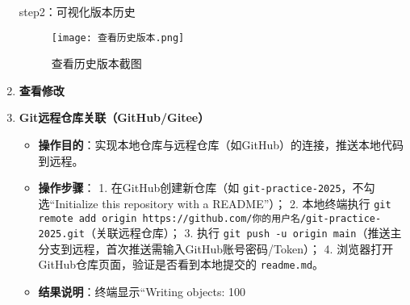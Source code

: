 \documentclass[a4paper]{article}
\begin{document}
\begin{enumerate}[itemsep=2\parskip, label=实例1.\arabic*]
\begin {description}[
leftmargin=7em, %
labelwidth=5em, %
labelsep=1em, %
itemsep=1\parskip, %
align=right %
]
step2：可视化版本历史

\begin{figure}[hbtp]  %
  \centering  %
  \texttt{[image: 查看历史版本.png]}  %
  \caption{查看历史版本截图}  %
  \label{fig:git-log}  %
\end{figure} 
\end{description}

\item \textbf {查看修改}

\item \textbf{Git远程仓库关联（GitHub/Gitee）}
  \begin{itemize}[leftmargin=2em, itemsep=0.5\parskip]
    \item \textbf{操作目的}：实现本地仓库与远程仓库（如GitHub）的连接，推送本地代码到远程。
    \item \textbf{操作步骤}：
      1. 在GitHub创建新仓库（如 \texttt{git-practice-2025}，不勾选“Initialize this repository with a README”）；
      2. 本地终端执行 \texttt{git remote add origin https://github.com/你的用户名/git-practice-2025.git}（关联远程仓库）；
      3. 执行 \texttt{git push -u origin main}（推送主分支到远程，首次推送需输入GitHub账号密码/Token）；
      4. 浏览器打开GitHub仓库页面，验证是否看到本地提交的 \texttt{readme.md}。
    \item \textbf{结果说明}：终端显示“Writing objects: 100%
  \end{itemize}


\end{enumerate}
\end{document}
